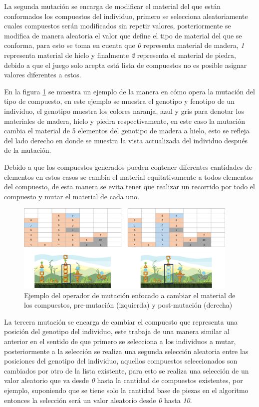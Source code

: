 La segunda mutación se encarga de modificar el material del que están
conformados los compuestos del individuo, primero se selecciona aleatoriamente 
cuales compuestos serán modificados sin
repetir valores, posteriormente se modifica de manera aleatoria el valor que
define el tipo de material del que se conforma, para esto se toma en cuenta que
\textit{0} representa material de madera, \textit{1} representa material de
hielo y finalmente \textit{2} representa el material de piedra, debido a que el
juego solo acepta está lista de compuestos no es posible asignar valores
diferentes a estos.

En la figura \ref{figure:mutate_material} se muestra un ejemplo de la manera en
cómo opera la mutación del tipo de compuesto, en este ejemplo se muestra el
genotipo y fenotipo de un individuo, el genotipo muestra los colores naranja,
azul y gris para denotar los materiales de madera, hielo y piedra
respectivamente, en este caso la mutación cambia el material de 5 elementos del
genotipo de madera a hielo, esto se refleja del lado derecho en donde se muestra
la vista actualizada del individuo después de la mutación.

Debido a que los compuestos generados pueden contener diferentes cantidades de
elementos en estos casos se cambia el material equitativamente a todos elementos
del compuesto, de esta manera se evita tener que realizar un recorrido por todo
el compuesto y mutar el material de cada uno.

\begin{figure}
  \centering
  \includegraphics[width=0.95\textwidth]{img/mutation_material.png}
  \caption{Ejemplo del operador de mutación enfocado a cambiar el material de los compuestos, pre-mutación (izquierda) y post-mutación (derecha)}
  \label{figure:mutate_material}
\end{figure}

La tercera mutación se encarga de cambiar el compuesto que representa una
posición del genotipo del individuo, este trabaja de una manera similar al
anterior en el sentido de que primero se selecciona a los individuos a mutar,
posteriormente a la selección se realiza una segunda selección aleatoria entre
las posiciones del genotipo del individuo, aquellos compuestos seleccionados son
cambiados por otro de la lista existente, para esto se realiza una selección de
un valor aleatorio que va desde \textit{0} hasta la cantidad de compuestos
existentes, por ejemplo, suponiendo que se tiene solo la cantidad base de piezas
en el algoritmo entonces la selección será un valor aleatorio desde \textit{0}
hasta \textit{10}.

